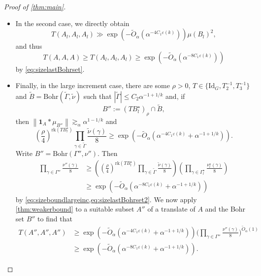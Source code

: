 \documentclass{daj}
\theoremstyle{definition}
\newcommand{\eps}{\varepsilon}
\newcommand{\m}[1]{\mu_{#1}}
\newcommand{\ind}[1]{\mathbf{1}_{#1}}
\newcommand{\norm}[1]{\left\|#1\right\|}
\newcommand{\geqs}[1]{\gtrsim_{#1}}
\begin{document}
\begin{proof}[Proof of \cref{thm:main}]
\begin{itemize}
	\item In the second case, we directly obtain 
	\begin{equation*}
	T(A_l, A_l, A_l) \gg \exp \left(-\widetilde{O}_{\alpha}\left(\alpha^{-4C_1\eps(k)}\right)\right) \mu(B_l)^2,
	\end{equation*}
	and thus 
	\begin{equation*}
	T(A, A, A) \geq T(A_l, A_l, A_l) \geq  \exp \left( - \tilde{O}_{\alpha}\left(\alpha^{-8C_1\eps(k)}\right) \right)
	\end{equation*}
	by \cref{eq:sizelastBohrset}.
	\item Finally, in the large increment case, there are some $\rho>0$, $T\in \{\mathrm{Id}_G, T_2^{-1}, T_3^{-1}\}$ and $\widetilde{B} = \mathrm{Bohr}(\widetilde{\Gamma}, \widetilde{\nu})$ such that ${|\widetilde{\Gamma}| \leq C_2\alpha^{-1+1/k}}$ and, if 
	\begin{equation*}
	B'' := (TB_l^{\star})_{\rho} \cap \widetilde{B},
	\end{equation*}
	then $\norm{\ind{A}*\m{B''}} \geqs{\alpha} \alpha^{1-1/k}$ and
	\begin{equation}
	\label{eq:sizeboundlargeinc}
	\left(\frac{\rho}{4}\right)^{\mathrm{rk}(TB_l^{\star})} \prod_{\gamma\in \widetilde{\Gamma}} \frac{\widetilde{\nu}(\gamma)}{8} \geq \exp \left(-\tilde{O}_{\alpha}\left(\alpha^{-4C_1\eps(k)}+\alpha^{-1+1/k}\right)\right).
	\end{equation}
	Write $B'' = \mathrm{Bohr}(\Gamma'', \nu'')$. Then
	\begin{align*}
	\prod_{\gamma\in \Gamma''} \frac{\nu''(\gamma)}{8} &\geq \left(\left(\frac{\rho}{4}\right)^{\mathrm{rk}(TB_l^{\star})} \prod_{\gamma\in \widetilde{\Gamma}} \frac{\widetilde{\nu}(\gamma)}{8}\right) \left(\prod_{\gamma\in \Gamma_l^{\star}} \frac{\nu_l^{\star}(\gamma)}{8}\right) \\
	&\geq \exp \left(-\tilde{O}_{\alpha}\left(\alpha^{-8C_1\eps(k)}+\alpha^{-1+1/k}\right)\right)
	\end{align*}	
	by \cref{eq:sizeboundlargeinc,eq:sizelastBohrset2}. We now apply \cref{thm:weakerbound} to a suitable subset $A''$ of a translate of $A$ and the Bohr set $B''$ to find that
	\begin{align*}
	T(A'', A'', A'') &\geq \exp \left(-\tilde{O}_{\alpha}\left(\alpha^{-4C_1\eps(k)}+\alpha^{-1+1/k}\right)\right) \bigg( \prod_{\gamma\in \Gamma''} \frac{\nu''(\gamma)}{8}\bigg)^{\tilde{O}_{\alpha}(1)} \\
	&\geq \exp \left(-\tilde{O}_{\alpha}\left(\alpha^{-8C_1\eps(k)}+\alpha^{-1+1/k}\right)\right).

\end{align*}
\end{itemize}
\end{proof}
\end{document}
